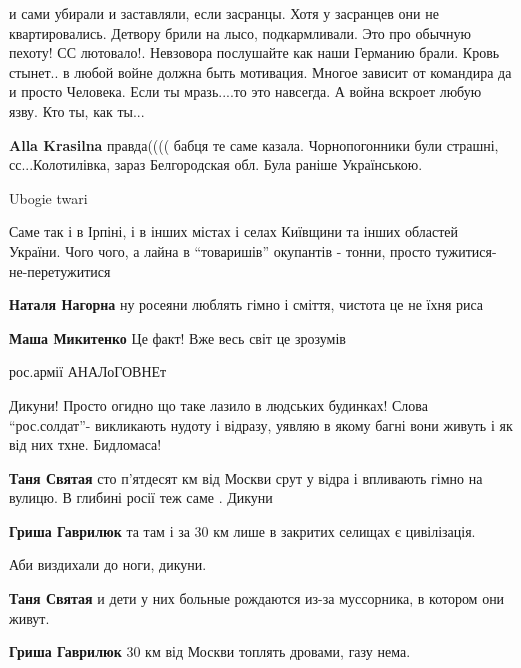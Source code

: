 \begin{itemize}
\begin{itemize}
и сами убирали и заставляли, если засранцы. Хотя у засранцев они не
квартировались. Детвору брили на лысо, подкармливали. Это про обычную пехоту!
СС лютовало!. Невзовора послушайте как наши Германию брали. Кровь стынет.. в
любой войне должна быть мотивация. Многое зависит от командира да и просто
Человека. Если ты мразь....то это навсегда. А война вскроет любую язву. Кто ты,
как ты...

\textbf{Alla Krasilna} правда(((( бабця те саме казала.
Чорнопогонники були страшні, сс...Колотилівка, зараз Белгородская обл. Була раніше Українською.


\end{itemize} %

Ubogie twari


Саме так і в Ірпіні, і в інших містах і селах Київщини та інших областей
України. Чого чого, а лайна в \enquote{товаришів} окупантів - тонни, просто
тужитися-не-перетужитися

\begin{itemize} %
\textbf{Наталя Нагорна} ну росеяни люблять гімно і сміття, чистота це не їхня риса

\textbf{Маша Микитенко} Це факт! Вже весь світ це зрозумів

рос.армії АНАЛоГОВНЕт
\end{itemize} %


Дикуни! Просто огидно що таке лазило в людських будинках! Слова \enquote{рос.солдат}-
викликають нудоту і відразу, уявляю в якому багні вони живуть і як від них
тхне. Бидломаса!

\begin{itemize} %
\textbf{Таня Святая} сто п'ятдесят км від Москви срут у відра і впливають гімно на вулицю. В глибині росії теж саме . Дикуни

\textbf{Гриша Гаврилюк} та там і за 30 км лише в закритих селищах є цивілізація.

Аби виздихали до ноги, дикуни.

\textbf{Таня Святая} и дети у них больные рождаются из-за муссорника, в котором они живут.

\textbf{Гриша Гаврилюк} 30 км від Москви топлять дровами, газу нема.


\end{itemize}
\end{itemize}
